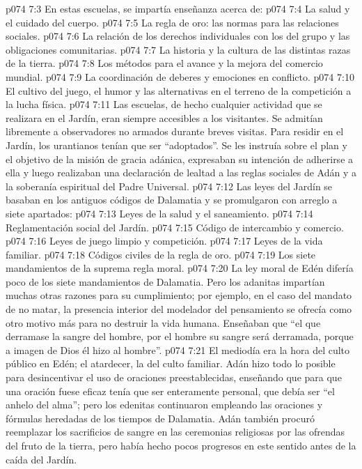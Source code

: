 \vs p074 7:3 En estas escuelas, se impartía enseñanza acerca de:
\vs p074 7:4 La salud y el cuidado del cuerpo.
\vs p074 7:5 La regla de oro: las normas para las relaciones sociales.
\vs p074 7:6 La relación de los derechos individuales con los del grupo y las obligaciones comunitarias.
\vs p074 7:7 La historia y la cultura de las distintas razas de la tierra.
\vs p074 7:8 Los métodos para el avance y la mejora del comercio mundial.
\vs p074 7:9 La coordinación de deberes y emociones en conflicto.
\vs p074 7:10 El cultivo del juego, el humor y las alternativas en el terreno de la competición a la lucha física.
\vs p074 7:11 \pc Las escuelas, de hecho cualquier actividad que se realizara en el Jardín, eran siempre accesibles a los visitantes. Se admitían libremente a observadores no armados durante breves visitas. Para residir en el Jardín, los urantianos tenían que ser “adoptados”. Se les instruía sobre el plan y el objetivo de la misión de gracia adánica, expresaban su intención de adherirse a ella y luego realizaban una declaración de lealtad a las reglas sociales de Adán y a la soberanía espiritual del Padre Universal.
\vs p074 7:12 \pc Las leyes del Jardín se basaban en los antiguos códigos de Dalamatia y se promulgaron con arreglo a siete apartados:
\vs p074 7:13 Leyes de la salud y el saneamiento.
\vs p074 7:14 Reglamentación social del Jardín.
\vs p074 7:15 Código de intercambio y comercio.
\vs p074 7:16 Leyes de juego limpio y competición.
\vs p074 7:17 Leyes de la vida familiar.
\vs p074 7:18 Códigos civiles de la regla de oro.
\vs p074 7:19 Los siete mandamientos de la suprema regla moral.
\vs p074 7:20 \pc La ley moral de Edén difería poco de los siete mandamientos de Dalamatia. Pero los adanitas impartían muchas otras razones para su cumplimiento; por ejemplo, en el caso del mandato de no matar, la presencia interior del modelador del pensamiento se ofrecía como otro motivo más para no destruir la vida humana. Enseñaban que “el que derramase la sangre del hombre, por el hombre su sangre será derramada, porque a imagen de Dios él hizo al hombre”.
\vs p074 7:21 El mediodía era la hora del culto público en Edén; el atardecer, la del culto familiar. Adán hizo todo lo posible para desincentivar el uso de oraciones preestablecidas, enseñando que para que una oración fuese eficaz tenía que ser enteramente personal, que debía ser “el anhelo del alma”; pero los edenitas continuaron empleando las oraciones y fórmulas heredadas de los tiempos de Dalamatia. Adán también procuró reemplazar los sacrificios de sangre en las ceremonias religiosas por las ofrendas del fruto de la tierra, pero había hecho pocos progresos en este sentido antes de la caída del Jardín.
